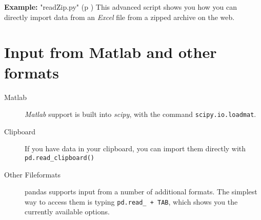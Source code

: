 \textbf{Example: }
\PyImg "readZip.py" (p \pageref{py:readZip}) This advanced script shows you how you can directly import data from an \emph{Excel} file from a zipped archive on the web.

\section{Input from Matlab and other formats}

\begin{description}
  \item[Matlab] \emph{Matlab} support is built into \emph{scipy}, with the command \lstinline{scipy.io.loadmat}.
  \item[Clipboard] If you have data in your clipboard, you can import them directly with \lstinline{pd.read_clipboard()}
  \item[Other Fileformats] pandas supports input from a number of additional formats. The simplest way to access them is typing \lstinline{pd.read_ + TAB}, which shows you the currently available options.
\end{description}
